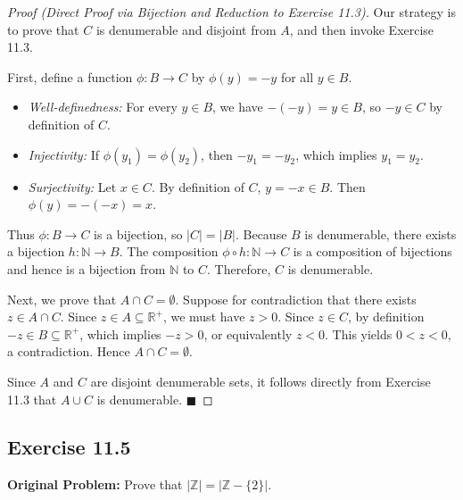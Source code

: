 \documentclass[11pt, letterpaper]{article}
\theoremstyle{definition}
\theoremstyle{remark}
\begin{document}
\begin{proof}[Proof (Direct Proof via Bijection and Reduction to Exercise 11.3)]
Our strategy is to prove that $C$ is denumerable and disjoint from $A$, and then invoke Exercise 11.3.

First, define a function $\phi : B \to C$ by $\phi(y) = -y$ for all $y \in B$.
\begin{itemize}
    \item \textit{Well-definedness:} For every $y \in B$, we have $-(-y) = y \in B$, so $-y \in C$ by definition of $C$.
    \item \textit{Injectivity:} If $\phi(y_1) = \phi(y_2)$, then $-y_1 = -y_2$, which implies $y_1 = y_2$.
    \item \textit{Surjectivity:} Let $x \in C$. By definition of $C$, $y = -x \in B$. Then $\phi(y) = -(-x) = x$.
\end{itemize}
Thus $\phi : B \to C$ is a bijection, so $|C| = |B|$. Because $B$ is denumerable, there exists a bijection $h : \mathbb{N} \to B$. The composition $\phi \circ h : \mathbb{N} \to C$ is a composition of bijections and hence is a bijection from $\mathbb{N}$ to $C$. Therefore, $C$ is denumerable.

Next, we prove that $A \cap C = \emptyset$. Suppose for contradiction that there exists $z \in A \cap C$. Since $z \in A \subseteq \mathbb{R}^+$, we must have $z > 0$. Since $z \in C$, by definition $-z \in B \subseteq \mathbb{R}^+$, which implies $-z > 0$, or equivalently $z < 0$. This yields $0 < z < 0$, a contradiction. Hence $A \cap C = \emptyset$.

Since $A$ and $C$ are disjoint denumerable sets, it follows directly from Exercise 11.3 that $A \cup C$ is denumerable. $\blacksquare$
\end{proof}

\subsection*{Exercise 11.5}
\textbf{Original Problem:} Prove that $|\mathbb{Z}| = |\mathbb{Z} - \{2\}|$.
\end{document}
